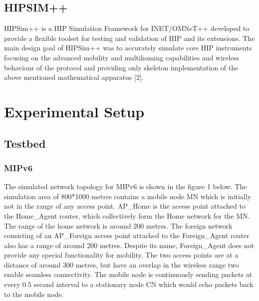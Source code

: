 \documentclass{llncs}
\begin{document}
\subsection{HIPSIM++}
HIPSim++ is a HIP Simulation Framework for INET/OMNeT++ developed to provide a flexible toolset for testing and validation of HIP and its extensions. The main design goal of HIPSim++ was to accurately simulate core HIP instruments focusing on the advanced mobility and multihoming capabilities and wireless behaviour of the protocol and providing only skeleton implementation of the above mentioned mathematical apparatus [2].

\section{Experimental Setup}

\subsection{Testbed}

\subsubsection{MIPv6}
The simulated network topology for MIPv6 is shown in the figure 1 below. The simulation area of 800*1000 metres contains a mobile node MN which is initially not in the range of any access point. AP\_Home is the access point attached to the Home\_Agent router, which collectively form the Home network for the MN. The range of the home network is around 200 metres. The foreign network consisting of an AP\_Foreign access point attached to the Foreign\_Agent router also has a range of around 200 metres. Despite its name, Foreign\_Agent does not provide any special functionality for mobility. The two access points are at a distance of around 300 metres, but have an overlap in the wireless range two enable seamless connectivity. The mobile node is continuously sending packets at every 0.5 second interval to a stationary node CN which would echo packets back to the mobile node.
\end{document}
